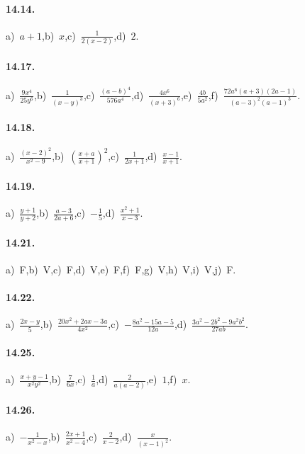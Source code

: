 \paragraph{14.14.}
a)~$a+1$,\quad b)~$x$,\quad c)~$\frac{1}{2(x-2)}$,\quad d)~$2$.

\paragraph{14.17.}
a)~$\frac{9x^{4}}{25y^{6}}$,\quad b)~$\frac{1}{(x-y)^{3}}$,\quad c)~$\frac{(a-b)^{4}}{576a^{4}}$,\quad d)~$\frac{4x^{6}}{(x+3)^{6}}$,\quad e)~$\frac{4b}{5a^{2}}$,\quad f)~$\frac{72a^{6}(a+3)(2a-1)}{(a-3)^{2}(a-1)^{3}}$.

\paragraph{14.18.}
a)~$\frac{(x-2)^{2}}{x^{2}-9}$,\quad b)~$\left(\frac{x+a}{x+1}\right)^{2}$,\quad c)~$\frac{1}{2x+1}$,\quad d)~$\frac{x-1}{x+1}$.

\paragraph{14.19.}
a)~$\frac{y+1}{y+2}$,\quad b)~$\frac{a-3}{2a+6}$,\quad c)~$-{\frac{1}{5}}$,\quad d)~$\frac{x^{2}+1}{x-3}$.

\paragraph{14.21.}
a)~F,\quad b)~V,\quad c)~F,\quad d)~V,\quad e)~F,\quad f)~F,\quad g)~V,\quad h)~V,\quad i)~V,\quad j)~F.

\paragraph{14.22.}
a)~$\frac{2x-y}{5}$,\quad b)~$\frac{20x^{2}+2ax-3a}{4x^{2}}$,\quad c)~$-{\frac{8a^{2}-15a-5}{12a}}$,\quad d)~$\frac{3a^{2}-2b^{2}-9a^{2}b^{2}}{27ab}$.

\paragraph{14.25.}
a)~$\frac{x+y-1}{x^{2}y^{2}}$,\quad b)~$\frac{7}{6x}$,\quad c)~$\frac{1}{a}$,\quad d)~$\frac{2}{a(a-2)}$,\quad e)~$1$,\quad f)~$x$.

\paragraph{14.26.}
a)~$-{\frac{1}{x^{2}-x}}$,\quad b)~$\frac{2x+1}{x^{2}-4}$,\quad c)~$\frac{2}{x-2}$,\quad d)~$\frac{x}{(x-1)^{2}}$.

